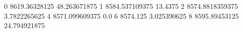 0 8619.36328125 48.263671875
1 8584.537109375 13.4375
2 8574.8818359375 3.7822265625
4 8571.099609375 0.0
6 8574.125 3.025390625
8 8595.89453125 24.794921875
